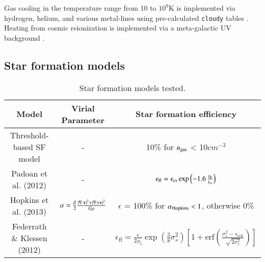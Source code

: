 \documentclass{aa}
\begin{document}
Gas cooling in the temperature range from 10 to $10^9$K is implemented via hydrogen, helium, and various metal-lines using pre-calculated \texttt{cloudy} \citep[version 07.02;][]{Ferland1998} tables \citep{Shen2010,Obreja2019}. Heating from cosmic reionization is implemented via a meta-galactic UV background \citep{Haardt2012}. 

\subsection{Star formation models}
\label{sec:SF}

\begin{table*}
\caption[]{Star formation models tested.}
         \label{tab:models}
\begin{center}
\renewcommand{\arraystretch}{1.5}
\begin{tabular}{ccc}
\hline
Model & Virial Parameter & Star formation efficiency \\
\hline
Threshold-based SF model & - & 10\% for $n_{\rm gas}$ < 10$cm^{-3}$  \\
Padoan et al. (2012) & - & $\epsilon_{\mathrm{ff}}=\epsilon_{\rm{cs}} \, \mathrm{exp}\left(-1.6 \, \frac{t_{\mathrm{ff}}}{t_{\mathrm{cr}}}\right)$ \\
Hopkins et al. (2013) & $ \alpha= \frac{\beta}{2} \frac{\left\vert\nabla \cdot \textbf v \right\vert^2+\left\vert\nabla \times \textbf v \right\vert^2}{G\rho} $ & $\epsilon$ = 100\% for $\alpha_{\rm Hopkins} < 1$, otherwise 0\%\\
Federrath \& Klessen (2012) & - & $\epsilon_{\mathrm{ff}} = \frac{\epsilon}{2\phi_t}
\exp\left(\frac{3}{8} \sigma_s^2 \right)
\left[
 1 + \mathrm{erf}\left( \frac{\sigma_s^2 - s_{\mathrm{crit}}}{\sqrt{2\sigma_s^2}}\right)\right]
$  \\
\hline
\end{tabular}
\end{center}
\end{table*}
\end{document}
